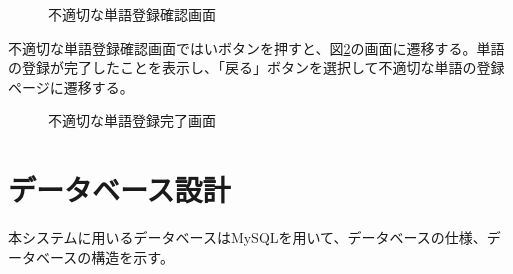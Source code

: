 \documentclass[a4j]{jarticle}
\begin{document}
\begin{figure}[H]
\centering
{}
\caption{不適切な単語登録確認画面}
\label{fig:NGword_confirm}
\end{figure}
不適切な単語登録確認画面ではいボタンを押すと、図\ref{fig:NGword_ok}の画面に遷移する。単語の登録が完了したことを表示し、「戻る」ボタンを選択して不適切な単語の登録ページに遷移する。
\begin{figure}[H]
\centering
{}
\caption{不適切な単語登録完了画面}
\label{fig:NGword_ok}
\end{figure}

\section{データベース設計}
本システムに用いるデータベースはMySQLを用いて、データベースの仕様、データベースの構造を示す。
\end{document}
